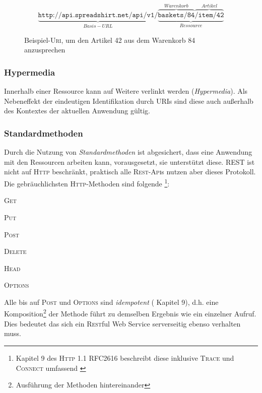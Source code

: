 \begin{figure}
    \centering
    \[
        \underbrace{\texttt{http://api.spreadshirt.net/api/v1/}}_{Basis-URL}\underbrace{\overbrace{\texttt{baskets/84}}^{Warenkorb}\overbrace{\texttt{/item/42}}^{Artikel}}_{Ressource}
    \]
    \caption{Beispiel-\textsc{Uri}, um den Artikel 42 aus dem Warenkorb 84 anzusprechen}
    \label{fig:RESTexampleURI}
\end{figure}

\subsubsection{Hypermedia}
\label{sec:hypermedia}

Innerhalb einer Ressource kann auf Weitere verlinkt werden (\emph{Hypermedia}). Als Nebeneffekt der eindeutigen Identifikation durch \glspl{URI} sind diese auch außerhalb des Kontextes der aktuellen Anwendung gültig. 


\subsubsection{Standardmethoden}
\label{sec:standardmethods}

Durch die Nutzung von \emph{Standardmethoden} ist abgesichert, dass eine Anwendung mit den Ressourcen arbeiten kann, vorausgesetzt, sie unterstützt diese. \gls{REST} ist nicht auf \textsc{Http} beschränkt, praktisch alle \textsc{Rest}-\textsc{Api}s nutzen aber dieses Protokoll. Die gebräuchlichsten \textsc{Http}-Methoden sind folgende \footnote{Kapitel 9 des \textsc{Http} 1.1 RFC2616 beschreibt diese inklusive \textsc{Trace} und \textsc{Connect} umfassend \cite{rfc2616}}:
\begin{compactitem}
    \item \textsc{Get}
    \item \textsc{Put}
    \item \textsc{Post}
    \item \textsc{Delete}
    \item \textsc{Head}
    \item \textsc{Options}
\end{compactitem}

Alle bis auf \textsc{Post} und \textsc{Options} sind \emph{idempotent} (\cite{rfc2616} Kapitel 9), d.h. eine Komposition\footnote{Ausführung der Methoden hintereinander} der Methode führt zu demselben Ergebnis wie ein einzelner Aufruf. Dies bedeutet das sich ein \textsc{Rest}ful Web Service serverseitig ebenso verhalten muss.

